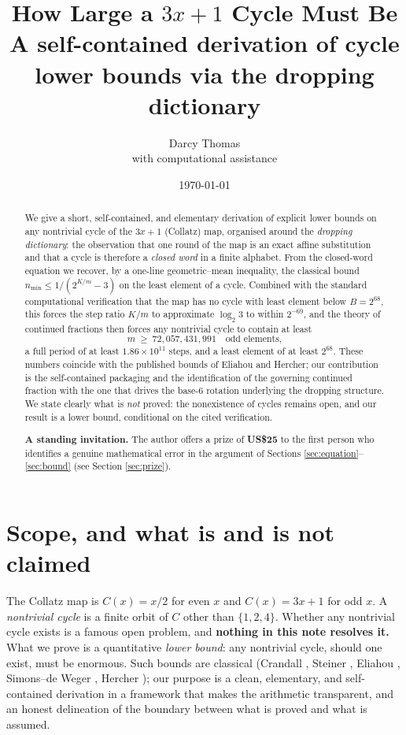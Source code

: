 \documentclass[11pt]{article}
\title{\textbf{How Large a $3x+1$ Cycle Must Be}\\[2pt]
\large A self-contained derivation of cycle lower bounds via the dropping dictionary}
\author{Darcy Thomas \\ \small with computational assistance}
\date{\today}
\theoremstyle{definition}
\newcommand{\nmin}{n_{\min}}
\begin{document}
\maketitle

\begin{abstract}
We give a short, self-contained, and elementary derivation of explicit lower
bounds on any nontrivial cycle of the $3x+1$ (Collatz) map, organised around the
\emph{dropping dictionary}: the observation that one round of the map is an exact
affine substitution and that a cycle is therefore a \emph{closed word} in a finite
alphabet. From the closed-word equation we recover, by a one-line
geometric--mean inequality, the classical bound
$\nmin \le 1/(2^{K/m}-3)$ on the least element of a cycle. Combined with the
standard computational verification that the map has no cycle with least element
below $B = 2^{68}$, this forces the step ratio $K/m$ to approximate $\log_2 3$
to within $2^{-69}$, and the theory of continued fractions then forces any
nontrivial cycle to contain at least
\[
  m \ \ge\ 72{,}057{,}431{,}991 \quad\text{odd elements,}
\]
a full period of at least $1.86\times10^{11}$ steps, and a least element of at
least $2^{68}$. These numbers coincide with the published bounds of Eliahou and
Hercher; our contribution is the self-contained packaging and the identification
of the governing continued fraction with the one that drives the base-$6$
rotation underlying the dropping structure. We state clearly what is \emph{not}
proved: the nonexistence of cycles remains open, and our result is a lower bound,
conditional on the cited verification.

\medskip
\noindent\textbf{A standing invitation.} The author offers a prize of \textbf{US\$25}
to the first person who identifies a genuine mathematical error in the argument
of Sections \ref{sec:equation}--\ref{sec:bound} (see Section \ref{sec:prize}).
\end{abstract}

\section{Scope, and what is and is not claimed}

The Collatz map is $C(x) = x/2$ for even $x$ and $C(x) = 3x+1$ for odd $x$. A
\emph{nontrivial cycle} is a finite orbit of $C$ other than $\{1,2,4\}$. Whether
any nontrivial cycle exists is a famous open problem, and \textbf{nothing in this
note resolves it.} What we prove is a quantitative \emph{lower bound}: any
nontrivial cycle, should one exist, must be enormous. Such bounds are classical
(Crandall \cite{crandall}, Steiner \cite{steiner}, Eliahou \cite{eliahou},
Simons--de Weger \cite{simonsdeweger}, Hercher \cite{hercher}); our purpose is a
clean, elementary, and self-contained derivation in a framework that makes the
arithmetic transparent, and an honest delineation of the boundary between what
is proved and what is assumed.
\end{document}
